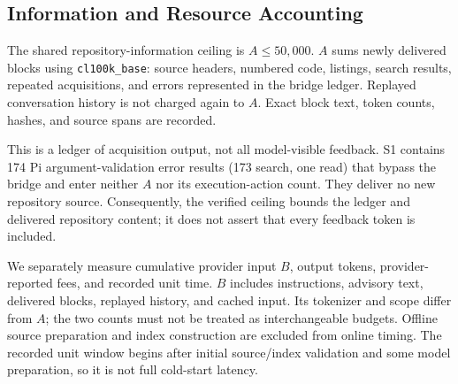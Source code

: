 \subsection{Information and Resource Accounting}
The shared repository-information ceiling is $A\leq50{,}000$. $A$ sums newly delivered blocks using \texttt{cl100k\_base}: source headers, numbered code, listings, search results, repeated acquisitions, and errors represented in the bridge ledger. Replayed conversation history is not charged again to $A$. Exact block text, token counts, hashes, and source spans are recorded.

This is a ledger of acquisition output, not all model-visible feedback. S1 contains 174 Pi argument-validation error results (173 search, one read) that bypass the bridge and enter neither $A$ nor its execution-action count. They deliver no new repository source. Consequently, the verified ceiling bounds the ledger and delivered repository content; it does not assert that every feedback token is included.

We separately measure cumulative provider input $B$, output tokens, provider-reported fees, and recorded unit time. $B$ includes instructions, advisory text, delivered blocks, replayed history, and cached input. Its tokenizer and scope differ from $A$; the two counts must not be treated as interchangeable budgets. Offline source preparation and index construction are excluded from online timing. The recorded unit window begins after initial source/index validation and some model preparation, so it is not full cold-start latency.

